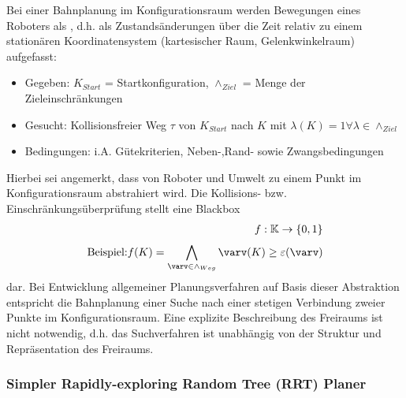 Bei einer Bahnplanung im Konfigurationsraum werden Bewegungen eines Roboters als , d.h. als Zustandsänderungen über die Zeit
relativ zu einem stationären Koordinatensystem (kartesischer Raum, Gelenkwinkelraum) aufgefasst:
\begin{itemize}
\item Gegeben: $K_{Start}$ = Startkonfiguration, $\land_{Ziel}$ = Menge der Zieleinschränkungen
\item Gesucht: Kollisionsfreier Weg $\tau$ von $K_{Start}$ nach $K$ mit $\lambda(K)=1 \forall \lambda \in \land_{Ziel}$
\item Bedingungen: i.A. Gütekriterien, Neben-,Rand- sowie Zwangsbedingungen
\end{itemize}
Hierbei sei angemerkt, dass von Roboter und Umwelt zu einem Punkt im Konfigurationsraum abstrahiert wird. Die Kollisions- bzw. Einschränkungsüberprüfung stellt eine Blackbox
\begin{align*}
f: \mathbb{K} \rightarrow \{0, 1\}\\
\text{Beispiel:} f(K) = \bigwedge\limits_{\varv \in \land_{Weg}}^{} \varv(K) \geq \varepsilon(\varv)
\end{align*}
dar. Bei Entwicklung allgemeiner Planungsverfahren auf Basis dieser Abstraktion entspricht die Bahnplanung einer Suche nach einer stetigen Verbindung zweier Punkte im
Konfigurationsraum. Eine explizite Beschreibung des Freiraums ist nicht notwendig, d.h. das Suchverfahren ist unabhängig von der Struktur und Repräsentation des Freiraums.

\subsubsection*{Simpler Rapidly-exploring Random Tree (RRT) Planer}
